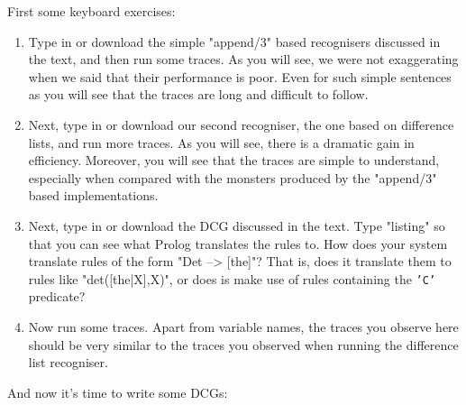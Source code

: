 First some keyboard exercises:
\begin{enumerate}

\item{}Type in or download the simple "append/3" based recognisers
discussed in the text, and then run some traces.  As you will see, we
were not exaggerating when we said that their performance is
poor. Even for such simple sentences as 
you will see that the traces are long and difficult to follow.

\item{}Next, type in or download our second recogniser, the one based
on difference lists, and run more traces. As you will see, there is a
dramatic gain in efficiency. Moreover, you will see that the traces
are  simple to understand, especially when compared with the
monsters produced by the "append/3" based implementations.

\item{}Next, type in or download the DCG discussed in the text.  Type
"listing" so that you can see what Prolog translates the rules
to. How does your system translate rules of the form   
"Det --> [the]"? That is, does it translate them to rules like
"det([the|X],X)", or does is make use of rules
containing the \texttt{'C'} predicate?

\item{}Now run some traces. Apart from variable names, the traces you
observe here should be very similar to the traces you observed when
running the difference list recogniser.

\end{enumerate}


And now it's time to write some DCGs:

